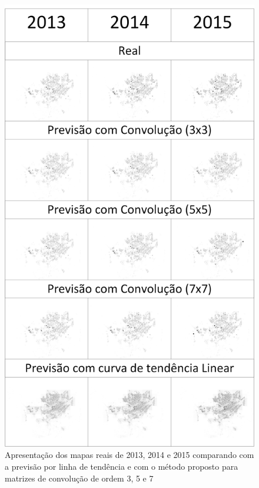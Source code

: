 \begin{figure}[h]
	\centering	
    \includegraphics[scale=0.7]{Figuras/AllResults.png}
	\caption{Apresentação dos mapas reais de 2013, 2014 e 2015 comparando com a previsão por linha de tendência e com o método proposto para matrizes de convolução de ordem 3, 5 e 7}
	\label{fig:allResults}
\end{figure}

